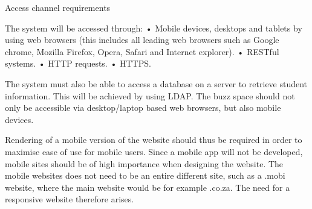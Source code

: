 Access channel requirements

The system will be accessed through:
•	Mobile devices, desktops and tablets by using web browsers (this includes all leading web browsers such as Google chrome, Mozilla Firefox, Opera, Safari and Internet explorer).
•	RESTful systems.
•	HTTP requests.
•	HTTPS.

The system must also be able to access a database on a server to retrieve student information. This will be achieved by using LDAP.
The buzz space should not only be accessible via desktop/laptop based web browsers, but also mobile devices.

Rendering of a mobile version of the website should thus be required in order to maximise ease of use for mobile users. Since a mobile app will not be developed, mobile sites should be of high importance when designing the website. The mobile websites does not need to be an entire different site, such as a .mobi website, where the main website would be for example .co.za. The need for a responsive website therefore arises.

